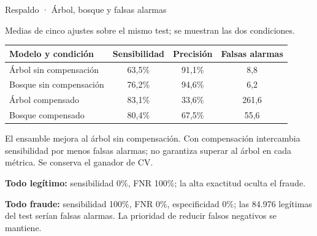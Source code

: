 \documentclass[aspectratio=169,10pt]{beamer}
\begin{document}
\begin{frame}{Respaldo · Árbol, bosque y falsas alarmas}
  \raggedright
  {\small Medias de cinco ajustes sobre el mismo test; se muestran las dos condiciones.}\par
  \vspace{0.18cm}
  {\small
  \begin{tabularx}{\textwidth}{X c c c}
    \toprule
    \rowcolor{FraudPaleBlue}\textbf{Modelo y condición} & \textbf{Sensibilidad} & \textbf{Precisión} & \textbf{Falsas alarmas} \\
    \midrule
    Árbol sin compensación & 63,5\% & 91,1\% & 8,8 \\
    Bosque sin compensación & 76,2\% & 94,6\% & 6,2 \\
    \rowcolor{FraudLightGray}Árbol compensado & 83,1\% & 33,6\% & 261,6 \\
    \rowcolor{FraudLightGray}Bosque compensado & 80,4\% & 67,5\% & 55,6 \\
    \bottomrule
  \end{tabularx}}
  \vspace{0.2cm}
  {\small El ensamble mejora al árbol sin compensación. Con compensación intercambia sensibilidad por menos falsas alarmas; no garantiza superar al árbol en cada métrica. Se conserva el ganador de CV.}\par
  \vspace{0.18cm}
  {\small\textbf{Todo legítimo:} sensibilidad 0\%, FNR 100\%; la alta exactitud oculta el fraude.}\par
  \vspace{0.12cm}
  {\small\textbf{Todo fraude:} sensibilidad 100\%, FNR 0\%, especificidad 0\%; las 84.976 legítimas del test serían falsas alarmas. La prioridad de reducir falsos negativos se mantiene.}\par
\end{frame}
\end{document}
